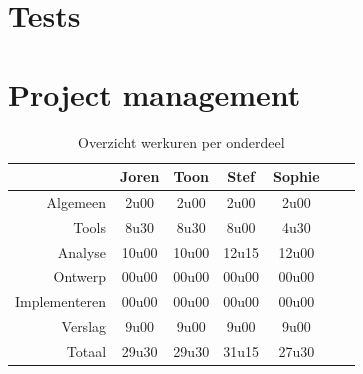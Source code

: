 \documentclass[i2]{oss}
\begin{document}
\section{Tests}
\label{ssec:tests}


\section{Project management}
\label{ssec:Projectmanag}


\begin{table}[h!]
\begin{center}
    \begin{tabular}{ r | c  c  c  c  c  c}
     & Joren & Toon & Stef & Sophie \\ \hline
    Algemeen & 2u00 & 2u00 & 2u00 & 2u00\\
           Tools & 8u30 & 8u30 & 8u00 & 4u30 \\
        Analyse & 10u00 & 10u00 & 12u15 & 12u00 \\
        Ontwerp & 00u00 & 00u00 & 00u00 & 00u00 \\
        Implementeren & 00u00 & 00u00 & 00u00 & 00u00\\
        Verslag & 9u00 & 9u00 & 9u00 & 9u00 \\
        Totaal & 29u30 & 29u30 & 31u15 & 27u30  
    \end{tabular}
    \caption{Overzicht werkuren per onderdeel}
    \label{tab:werkuren}
\end{center}
\end{table}
\end{document}
